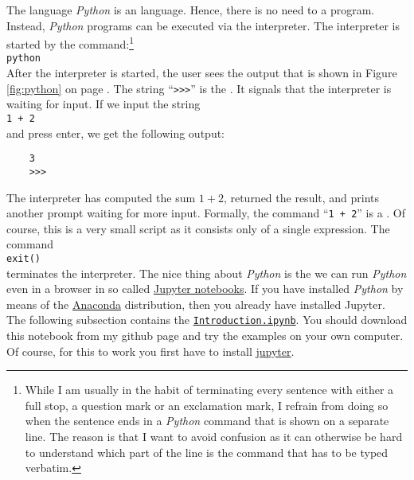 The language \textsl{Python} is an  language.  Hence, there is no need to  a
program.  Instead, \textsl{Python} programs can be executed via the interpreter.  The interpreter is started
by the command:\footnote{
  While I am usually in the habit of terminating every sentence with either a full stop, a question
  mark or an exclamation mark, I refrain from doing so when the sentence ends in a \textsl{Python} command
  that is shown on a separate line.  The reason is that I want to avoid confusion as it can
  otherwise be hard to understand which part of the line is the command that has to be typed
  verbatim.
}
\\[0.2cm]
\hspace*{1.3cm}
\texttt{python}
\\[0.2cm]
After the interpreter is started, the user sees the output that is shown in Figure 
\ref{fig:python} on page \pageref{fig:python}.  The string
``\texttt{>>>}'' is the .  It signals that the interpreter is waiting for input.
If we input the string
\\[0.2cm]
\hspace*{1.3cm}
\texttt{1 + 2}
\\[0.2cm]
and press enter, we get the following output:
\begin{verbatim}
    3
    >>> 
\end{verbatim}
The interpreter has computed the sum $1+2$, returned the result, and prints another prompt waiting
for more input.  Formally, the command ``\texttt{1 + 2}''
is a .  Of course, this is a very small script as it consists only of a single expression.
The command
\\[0.2cm]
\hspace*{1.3cm}
\texttt{exit()}
\\[0.2cm]
terminates the interpreter.   The nice thing about \textsl{Python}  is the we can run \textsl{Python} even in a
browser in so called \href{https://en.wikipedia.org/wiki/Project_Jupyter}{Jupyter notebooks}.  If you have
installed \textsl{Python} by means of the \href{https://www.anaconda.com/download/}{Anaconda} distribution,
then you already have installed Jupyter.  The following subsection contains the  
\href{https://github.com/karlstroetmann/Logik/blob/master/Python/Introduction.ipynb}{\texttt{Introduction.ipynb}}.
You should download this notebook from my github page and try the examples on your own computer.  Of course,
for this to work you first have to install \href{https://jupyter.org}{jupyter}.

